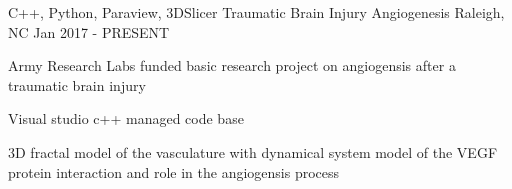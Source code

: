 \begin{cventries}
  \cventry
    {C++, Python, Paraview, 3DSlicer} %
    {Traumatic Brain Injury Angiogenesis } %
    {Raleigh, NC} %
    {Jan 2017 - PRESENT} %
    {
      \begin{cvitems} %
        \item {Army Research Labs funded basic research project on angiogensis after a traumatic brain injury}
        \item {Visual studio c++ managed code base}
        \item {3D fractal model of the vasculature with dynamical system model of the VEGF protein interaction and role in the angiogensis process}
      \end{cvitems}
    }
\end{cventries}
